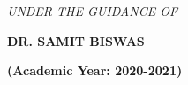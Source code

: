 \documentclass[a4paper, 12pt]{report}
\begin{document}
\begin{titlepage}
\begin{center}
        \textit{UNDER THE GUIDANCE OF}\\[0.7cm]
        \begin{large}
            \textbf{DR. SAMIT BISWAS}\\[0.3cm]
        \end{large}

        \textbf{(Academic Year: 2020-2021)}
    \end{center}   
\end{titlepage}
\newpage
\lipsum
\end{document}
